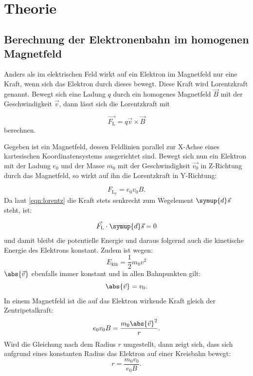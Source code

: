 \section{Theorie}
\label{sec:Theorie}

\subsection{Berechnung der Elektronenbahn im homogenen Magnetfeld}
Anders als im elektrischen Feld wirkt auf ein Elektron im Magnetfeld nur eine Kraft, wenn sich das Elektron durch dieses bewegt. Diese Kraft wird Lorentzkraft genannt. Bewegt sich eine Ladung $q$ durch ein homogenes Magnetfeld 
$\vec{B}$ mit der Geschwindigkeit $\vec{v}$, dann lässt sich die Lorentzkraft mit

\begin{equation}
\vec{F_{\text{L}}} = q \vec{v} \times \vec{B}
\label{eqn:lorentz}
\end{equation}
berechnen. 

Gegeben ist ein Magnetfeld, dessen Feldlinien parallel zur X-Achse eines kartesischen Koordinatensystems ausgerichtet sind. Bewegt sich nun ein Elektron mit der Ladung $e_0$ und der Masse $m_0$ mit der Geschwindigkeit $\vec{v_0}$ 
in Z-Richtung durch das Magnetfeld, so wirkt auf ihn die Lorentzkraft in Y-Richtung:

\begin{equation} 
F_{\text{L}_{\text{y}}} = e_0 v_0 B.
\end{equation}
Da laut \ref{eqn:lorentz} die Kraft stets senkrecht zum Wegelement $\symup{d}\vec{s}$ steht, ist:

\begin{equation}
\vec{F_{\text{L}}} \cdot \symup{d}\vec{s} = 0
\end{equation}
und damit bleibt die potentielle Energie und daraus folgernd auch die kinetische Energie des Elektrons konstant. Zudem ist wegen:
\begin{equation}
E_{\text{kin}} = \frac{1}{2} m_0 v^2
\end{equation}
$\abs{\vec{v}}$ ebenfalls immer konstant und in allen Bahnpunkten gilt:
\begin{equation}
\abs{\vec{v}} = v_0.
\end{equation}
In einem Magnetfeld ist die auf das Elektron wirkende Kraft gleich der Zentripetalkraft:
\begin{equation}
e_0 v_0 B = \frac{m_0 \abs{\vec{v}}^2}{r}.
\end{equation}
Wird die Gleichung nach dem Radius $r$ umgestellt, dann zeigt sich, dass sich aufgrund eines konstanten Radius das Elektron auf einer Kreisbahn bewegt:
\begin{equation}
r = \frac{m_0 v_0}{e_0 B}.
\label{eqn:radius}
\end{equation}

